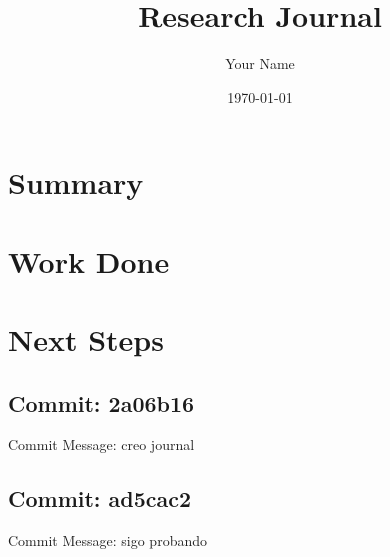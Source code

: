 \documentclass{article}
\begin{document}
\title{Research Journal}
\author{Your Name}
\date{\today}

\maketitle

\section{Summary}

\section{Work Done}

\section{Next Steps}


\subsection{Commit: 2a06b16}

Commit Message: creo journal


\subsection{Commit: ad5cac2}

Commit Message: sigo probando
\end{document}
